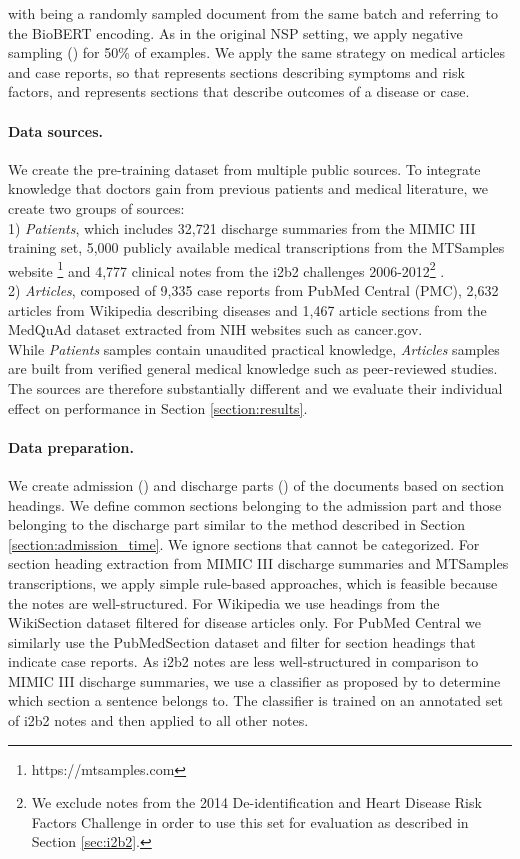 \documentclass[11pt,a4paper]{article}
\begin{document}
with  being a randomly sampled document from the same batch and  referring to the BioBERT encoding. As in the original NSP setting, we apply negative sampling ()  for 50\% of examples. We apply the same strategy on medical articles and case reports, so that  represents sections describing symptoms and risk factors, and  represents sections that describe outcomes of a disease or case.

\paragraph{Data sources.} We create the pre-training dataset from multiple public sources. To integrate knowledge that doctors gain from previous patients and medical literature, we create two groups of sources: \\1) \textit{Patients}, which includes 32,721 discharge summaries from the MIMIC III training set, 5,000 publicly available medical transcriptions from the MTSamples website \footnote{https://mtsamples.com} and 4,777 clinical notes from the i2b2 challenges 2006-2012\footnote{We exclude notes from the 2014 De-identification and Heart Disease Risk Factors Challenge in order to use this set for evaluation as described in Section \ref{sec:i2b2}.} \cite{i2b2-2006,i2b2-2006-2,i2b2-2009,i2b2-2009-2,i2b2-2010,i2b2-2011,i2b2-2012,i2b2-2012-2}.\\
2) \textit{Articles}, composed of 9,335 case reports from PubMed Central (PMC), 2,632 articles from Wikipedia describing diseases and 1,467 article sections from the MedQuAd dataset \cite{medquad} extracted from NIH websites such as cancer.gov.\\
While \textit{Patients} samples contain unaudited practical knowledge, \textit{Articles} samples are built from verified general medical knowledge such as peer-reviewed studies. The sources are therefore substantially different and we evaluate their individual effect on performance in Section \ref{section:results}.

\paragraph{Data preparation.} 
We create admission () and discharge parts () of the documents based on section headings. 
We define common sections belonging to the admission part and those belonging to the discharge part similar to the method described in Section \ref{section:admission_time}. We ignore sections that cannot be categorized. For section heading extraction from MIMIC III discharge summaries and MTSamples transcriptions, we apply simple rule-based approaches, which is feasible because the notes are well-structured. For Wikipedia we use headings from the WikiSection dataset \cite{sector} filtered for disease articles only. For PubMed Central we similarly use the PubMedSection dataset \cite{language-modeling-enough} and filter for section headings that indicate case reports. As i2b2 notes are less well-structured in comparison to MIMIC III discharge summaries, we use a classifier as proposed by \citet{i2b2-section-prediction} to determine which section a sentence belongs to. The classifier is trained on an annotated set of i2b2 notes and then applied to all other notes.
\end{document}
